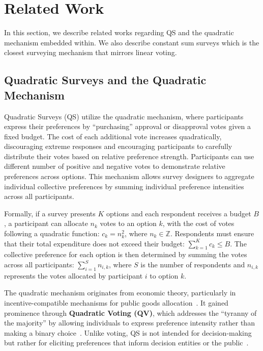 \section{Related Work}
\label{sec:relatedWorks}
In this section, we describe related works regarding QS and the quadratic mechanism embedded within. We also describe constant sum surveys which is the closest surveying mechanism that mirrors linear voting.

\subsection{Quadratic Surveys and the Quadratic Mechanism}
Quadratic Surveys (QS) utilize the quadratic mechanism, where participants express their preferences by ``purchasing'' approval or disapproval votes given a fixed budget. The cost of each additional vote increases quadratically, discouraging extreme responses and encouraging participants to carefully distribute their votes based on relative preference strength. Participants can use different number of positive and negative votes to demonstrate relative preferences across options. This mechanism allows survey designers to aggregate individual collective preferences by summing individual preference intensities across all participants.

Formally, if a survey presents $K$ options and each respondent receives a budget $B$, a participant can allocate $n_k$ votes to an option $k$, with the cost of votes following a quadratic function: $c_k = n_k^2$, where $n_k \in \mathbb{Z}$. Respondents must ensure that their total expenditure does not exceed their budget: $\sum_{k=1}^{K} c_k \leq B$. The collective preference for each option is then determined by summing the votes across all participants: $\sum_{i=1}^{S} n_{i,k}$, where $S$ is the number of respondents and $n_{i,k}$ represents the votes allocated by participant $i$ to option $k$.

The quadratic mechanism originates from economic theory, particularly in incentive-compatible mechanisms for public goods allocation~\cite{grovesOptimalAllocationPublic1977}. It gained prominence through \textbf{Quadratic Voting (QV)}, which addresses the ``tyranny of the majority'' by allowing individuals to express preference intensity rather than making a binary choice~\cite{posner2018radical}. Unlike voting, QS is not intended for decision-making but rather for eliciting preferences that inform decision entities or the public~\cite{chi}.

